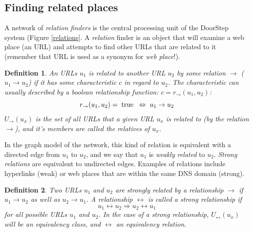 \documentclass[a4paper]{danarticle}
\newtheorem{definition}{Definition}
\theoremstyle{remark}
\begin{document}
     \subsection{Finding related places} 
       A network of \textit{relation finders} is the central processing unit of 
       the DoorStep system (Figure \ref{relations}. 
       A \textit{relation} finder is an object that will 
       examine a web place (an URL) and attempts to find other URLs that are 
       related to it (remember that URL is used as a synonym for \textit{web
       place}!). 
       \begin{definition}
       An URLs $ u_1 $ is related to another URL $ u_2 $ by some relation 
       $ \rightarrow $
       ($ u_1 \rightarrow u_2 $) if it has some characteristic $ c $ in regard
       to $ u_2 $. The characteristic can usually described by a boolean
       relationship function: $ c = r_{\rightarrow}(u_1, u_2) $:
       \[
         r_{\rightarrow}(u_1, u_2) = \hspace{1mm} \mbox{true} \hspace{2mm} 
	     \Leftrightarrow \hspace{1mm} u_1 \rightarrow u_2
       \]
       $ U_{\rightarrow}(u_x) $ is the set of all URLs that a given URL $ u_x $ 
       is related to (by the relation $ \rightarrow $), and it's members are 
       called the \emph{relatives} of $ u_x $.
       \end{definition}
       In the graph model of the network, this kind of relation is equivalent
       with a directed edge from $ u_1 $ to $ u_2 $, and we say that $ u_1 $ is
       \textit{weakly related} to $ u_2 $. \textit{Strong relations} are
       equivalent to undirected edges.
       Examples of relations include hyperlinks (weak) or web places that are
       within the same DNS domain (strong). 
       \begin{definition}
       Two URLs $ u_1 $ and $ u_2 $ are \emph{strongly related} by a relationship
       $ \rightarrow $ if $ u_1 \rightarrow u_2 $ as well as 
       $ u_2 \rightarrow u_1 $. A relationship $ \leftrightarrow $ is called a
       \emph{strong} relationship if
       \[
         u_1 \leftrightarrow u_2 \Rightarrow u_2 \leftrightarrow u_1 
       \]
       for all possible URLs $ u_1 $ and $ u_2 $. In the case of a strong 
       relationship, $ U_{\leftrightarrow}(u_x) $ will be an equivalency 
       class, and $ \leftrightarrow $ an equivalency relation.
       \end{definition}
\end{document}
